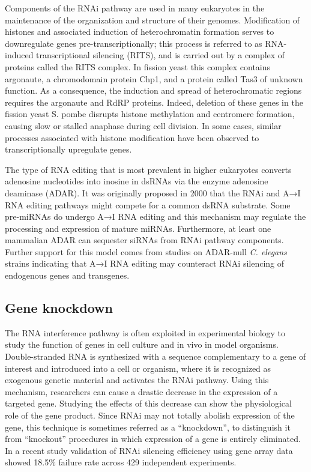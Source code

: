 Components of the RNAi pathway are used in many eukaryotes in the maintenance of the organization and structure of their genomes. Modification of histones and associated induction of heterochromatin formation serves to downregulate genes pre-transcriptionally; this process is referred to as RNA-induced transcriptional silencing (RITS), and is carried out by a complex of proteins called the RITS complex. In fission yeast this complex contains argonaute, a chromodomain protein Chp1, and a protein called Tas3 of unknown function. As a consequence, the induction and spread of heterochromatic regions requires the argonaute and RdRP proteins. Indeed, deletion of these genes in the fission yeast S. pombe disrupts histone methylation and centromere formation, causing slow or stalled anaphase during cell division. In some cases, similar processes associated with histone modification have been observed to transcriptionally upregulate genes.

The type of RNA editing that is most prevalent in higher eukaryotes converts adenosine nucleotides into inosine in dsRNAs via the enzyme adenosine deaminase (ADAR). It was originally proposed in 2000 that the RNAi and A→I RNA editing pathways might compete for a common dsRNA substrate. Some pre-miRNAs do undergo A→I RNA editing and this mechanism may regulate the processing and expression of mature miRNAs. Furthermore, at least one mammalian ADAR can sequester siRNAs from RNAi pathway components. Further support for this model comes from studies on ADAR-null \emph{C. elegans} strains indicating that A→I RNA editing may counteract RNAi silencing of endogenous genes and transgenes.

\hypertarget{gene-knockdown}{%
\subsection{Gene knockdown}\label{gene-knockdown}}

The RNA interference pathway is often exploited in experimental biology to study the function of genes in cell culture and in vivo in model organisms. Double-stranded RNA is synthesized with a sequence complementary to a gene of interest and introduced into a cell or organism, where it is recognized as exogenous genetic material and activates the RNAi pathway. Using this mechanism, researchers can cause a drastic decrease in the expression of a targeted gene. Studying the effects of this decrease can show the physiological role of the gene product. Since RNAi may not totally abolish expression of the gene, this technique is sometimes referred as a ``knockdown'', to distinguish it from ``knockout'' procedures in which expression of a gene is entirely eliminated. In a recent study validation of RNAi silencing efficiency using gene array data showed 18.5\% failure rate across 429 independent experiments.

